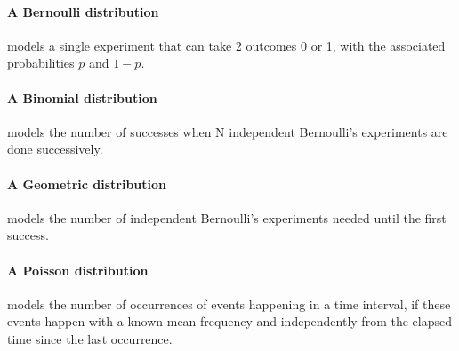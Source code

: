 \paragraph{A Bernoulli distribution} models a single experiment that can take 2 outcomes 0 or 1, with the associated probabilities $p$ and $1-p$.

\paragraph{A Binomial distribution} models the number of successes when N independent Bernoulli's experiments are done successively. 

\paragraph{A Geometric distribution} models the number of independent Bernoulli's experiments needed until the first success.

\paragraph{A Poisson distribution} models the number of occurrences of events happening in a time interval, if these events happen with a known mean frequency and independently from the elapsed time since the last occurrence.

